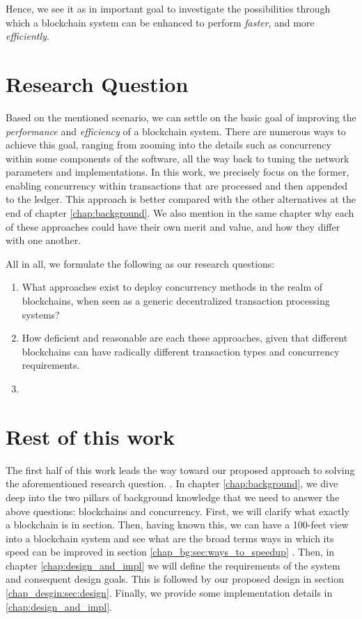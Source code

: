 Hence, we see it as in important goal to investigate the possibilities through which a blockchain
system can be enhanced to perform \textit{faster}, and more \textit{efficiently}.

\section{Research Question} \label{chap_intro:sec:resarch_q}

Based on the mentioned scenario, we can settle on the basic goal of improving the
\textit{performance} and \textit{efficiency} of a blockchain system. There are numerous ways to
achieve this goal, ranging from zooming into the details such as concurrency within some components
of the software, all the way back to tuning the network parameters and implementations. In this
work, we precisely focus on the former, enabling concurrency within transactions that are processed
and then appended to the ledger. This approach is better compared with the other alternatives at the
end of chapter \ref{chap:background}. We also mention in the same chapter why each of these
approaches could have their own merit and value, and how they differ with one another.

 All in all, we formulate the following as our research questions:

 \begin{enumerate}
     \item What approaches exist to deploy concurrency methods in the realm of blockchains, when
     seen as a generic decentralized transaction processing systems?
     \item How deficient and reasonable are each these approaches, given that different blockchains
	 can have radically different transaction types and concurrency requirements.
	 \item {}
 \end{enumerate}

\section{Rest of this work}

The first half of this work leads the way toward our proposed approach to solving the aforementioned
research question. . In
chapter \ref{chap:background}, we dive deep into the two pillars of background knowledge that we
need to answer the above questions: blockchains and concurrency. First, we will clarify what exactly
a blockchain is in section. Then, having known this, we can have a 100-feet view into a blockchain
system and see what are the broad terms ways in which its speed can be improved in section
\ref{chap_bg:sec:ways_to_speedup} . Then, in chapter \ref{chap:design_and_impl} we will define the
requirements of the system and consequent design goals. This is followed by our proposed design in
section \ref{chap_desgin:sec:design}. Finally, we provide some implementation details in
\ref{chap:design_and_impl}.


